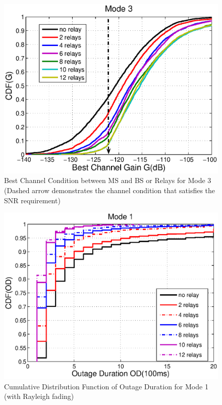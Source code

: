 \begin{figure}
\centering
\includegraphics[width=12cm]{Mode3_bestchannelgain_V2.eps}
\caption{Best Channel Condition between MS and BS or Relays for Mode 3 (Dashed arrow demonstrates the channel condition that satisfies the SNR requirement)}
\label{2:Mode3}
\end{figure}
\begin{figure}
\centering
\includegraphics[width=12cm]{OutageDuration_Rayleigh_Mode1_V2.eps}
\caption{Cumulative Distribution Function of Outage Duration for Mode 1 (with Rayleigh fading)}
\label{2:Mode1Out}
\end{figure}
